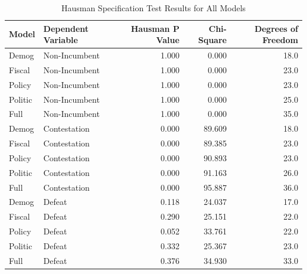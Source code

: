 \begin{table}[ht]
\centering
\begin{tabular}{llrrr}
  \hline
Model & Dependent Variable & Hausman P Value & Chi-Square & Degrees of Freedom \\ 
  \hline
Demog & Non-Incumbent & 1.000 & 0.000 & 18.0 \\ 
  Fiscal & Non-Incumbent & 1.000 & 0.000 & 23.0 \\ 
  Policy & Non-Incumbent & 1.000 & 0.000 & 23.0 \\ 
  Politic & Non-Incumbent & 1.000 & 0.000 & 25.0 \\ 
  Full & Non-Incumbent & 1.000 & 0.000 & 35.0 \\ 
  Demog & Contestation & 0.000 & 89.609 & 18.0 \\ 
  Fiscal & Contestation & 0.000 & 89.385 & 23.0 \\ 
  Policy & Contestation & 0.000 & 90.893 & 23.0 \\ 
  Politic & Contestation & 0.000 & 91.163 & 26.0 \\ 
  Full & Contestation & 0.000 & 95.887 & 36.0 \\ 
  Demog & Defeat & 0.118 & 24.037 & 17.0 \\ 
  Fiscal & Defeat & 0.290 & 25.151 & 22.0 \\ 
  Policy & Defeat & 0.052 & 33.761 & 22.0 \\ 
  Politic & Defeat & 0.332 & 25.367 & 23.0 \\ 
  Full & Defeat & 0.376 & 34.930 & 33.0 \\ 
   \hline
\end{tabular}
\caption{Hausman Specification Test Results for All Models} 
\end{table}










